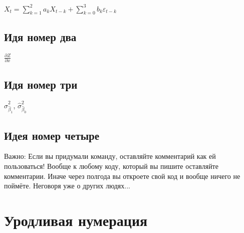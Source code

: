 \documentclass[12pt, a4paper]{article}
\theoremstyle{plain}              %
\theoremstyle{definition}         %
\renewcommand{\thepage}{\ifthispageodd{\Asbuk{page}}{\Roman{page}}}
\begin{document}
\newcommand{\ARMA}[2]{\ensuremath {X_t=\sum_{k=1}^{#1}a_k X_{t-k} + \sum_{k=0}^{#2}b_k \varepsilon_{t-k}}} 

\ARMA{2}{3} \\


\subsection{Идя номер два} 

\newcommand{\defp}[2]{$\frac{\partial{#1}}{\partial{#2}}$}

\defp{Z}{x}


\subsection{Идя номер три} 

\newcommand{\sbh}[1]{\ensuremath{\displaystyle \hat\sigma_{\hat\beta_#1}^2}}

\sbh{1}, \sbh{0}

\subsection{Идея номер четыре} 


\newcommand{\pic}[3]{\begin{figure}[H]
\begin{center}
\texttt{[image: \#2]}
\caption{#3}
\end{center}
\end{figure}}


Важно: Если вы придумали команду, оставляйте комментарий как ей пользоваться! Вообще к любому коду, который вы пишите оставляйте комментарии. Иначе через полгода вы откроете свой код и вообще ничего не поймёте. Неговоря уже о других людях...


\section{Уродливая нумерация}


  
\end{document}
